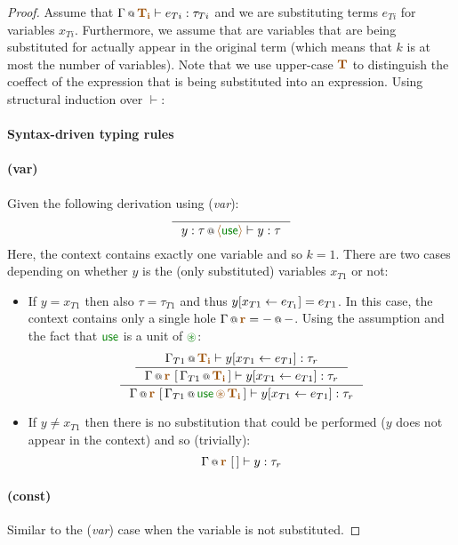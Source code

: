 \begin{proof}
Assume that $\coctx{\Gamma}{\aclrd{\mathbf{T_i}}} \vdash e_{Ti} : \tau_{Ti}$ and we are substituting terms $e_{Ti}$ for 
variables $x_{Ti}$. Furthermore, we assume that are variables that are being substituted for actually appear in the original 
term (which means that $k$ is at most the number of variables). Note that we use upper-case $\aclrd{\textbf{T}}$ to distinguish 
the coeffect of the expression that is being substituted into an expression. Using structural induction over $\vdash$:



\paragraph{Syntax-driven typing rules}
\paragraph{(var)} Given the following derivation using (\emph{var}):
\[
\inference
  { }
  {\coctx{y:\tau}{\alift{\cunit}} \vdash y : \tau }
\]
Here, the context contains exactly one variable and so $k=1$. There are two cases depending on whether $y$ is 
the (only substituted) variables $x_{T1}$ or not:
\begin{itemize}
\item If $y=x_{T1}$ then also $\tau = \tau_{T1}$ and thus $y[x_{T1} \leftarrow e_{T_1}] = e_{T1}$. 
In this case, the context contains only a single hole $\coctx{\Gamma}{\aclrd{\mathbf{r}}} = \coctx{-}{-}$. Using the
assumption and the fact that $\cunit$ is a unit of $\cseq$:
\[
\inference
 { \inference 
   {\coctx{\Gamma_{T1}}{\aclrd{\mathbf{T_i}}} \vdash \subst{y}{x_{T1}}{e_{T1}} : \tau_r }
   {\coctx{\Gamma}{\aclrd{\mathbf{r}}}~[\,\coctx{\Gamma_{T1}}{\aclrd{\mathbf{T_i}}}\,] \vdash \subst{y}{x_{T1}}{e_{T1}} : \tau_r } }
 { \coctx{\Gamma}{\aclrd{\mathbf{r}}}~[\,\coctx{\Gamma_{T1}}{\cunit\,\aseq\,\aclrd{\mathbf{T_i}}}\,] \vdash \subst{y}{x_{T1}}{e_{T1}} : \tau_r }   
\]
\item If $y\neq x_{T1}$ then there is no substitution that could be performed ($y$ does not 
appear in the context) and so (trivially):
\[
\coctx{\Gamma}{\aclrd{\mathbf{r}}}~[\,] \vdash y : \tau_r
\]
\end{itemize}

\paragraph{(const)} Similar to the (\emph{var}) case when the variable is not substituted.


\end{proof}

